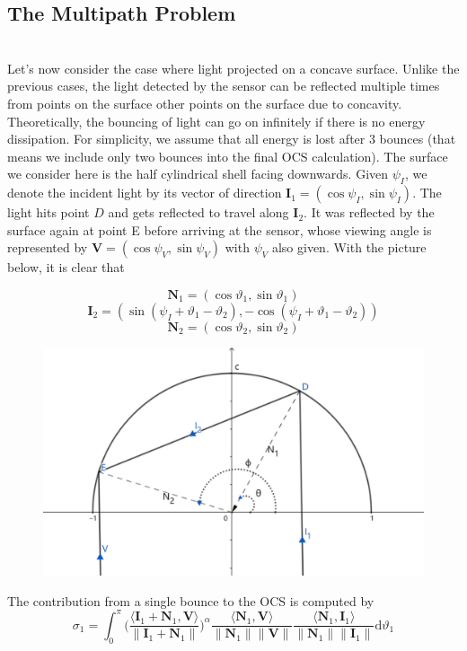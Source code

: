 \documentclass[11pt]{amsart}
\newcommand{\ip}[2]{\langle {#1}, {#2} \rangle}
\theoremstyle{definition}
\begin{document}
\subsection{The Multipath Problem}~\\
Let's now consider the case where light projected on a concave surface. Unlike the previous cases, the light detected by the sensor can be reflected multiple times from points on the surface other points on the surface due to concavity. Theoretically, the bouncing of light can go on infinitely if there is no energy dissipation. For simplicity, we assume that all energy is lost after 3 bounces (that means we include only two bounces into the final OCS calculation). The surface we consider here is the half cylindrical shell facing downwards. Given $\psi_I$, we denote the incident light by its vector of direction $\mathbf{I}_1=(\cos\psi_I,\sin\psi_I)$. The light hits point $D$ and gets reflected to travel along $\mathbf{I}_2$. It was reflected by the surface again at point E before arriving at the sensor, whose viewing angle is represented by $\mathbf{V}=(\cos\psi_V,\sin\psi_V)$ with $\psi_V$ also given. With the picture below, it is clear that

$$\mathbf{N}_1=(\cos\vartheta_1,\sin\vartheta_1)$$
$$\mathbf{I}_2= (\sin(\psi_I+\vartheta_1-\vartheta_2),-\cos(\psi_I+\vartheta_1-\vartheta_2))$$
$$\mathbf{N}_2= (\cos\vartheta_2,\sin\vartheta_2)$$

\begin{figure}[H]
  \includegraphics[width=4.5in]{./figs/multipath.pdf}
  \label{fig:reflection}
\end{figure}


The contribution from a single bounce to the OCS is computed by
$$\sigma_1 =\int_{0}^{\pi}\Bigg(\frac{\ip{\mathbf{I}_1+\mathbf{N}_1}{\mathbf{V}}}{\|\mathbf{I}_1+\mathbf{N}_1\|}\Bigg)^\alpha\frac{\ip{\mathbf{N}_1}{\mathbf{V}}}{\|\mathbf{N}_1\| \|\mathbf{V}\|}\frac{\ip{\mathbf{N}_1}{\mathbf{I}_1}}{\|\mathbf{N}_1\| \|\mathbf{I}_1\|} \mathrm{d}\vartheta_1$$
\end{document}
